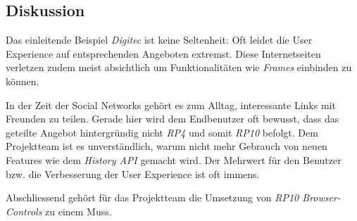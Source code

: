\subsection*{Diskussion}

Das einleitende Beispiel \emph{Digitec} ist keine Seltenheit: Oft leidet die User Experience auf entsprechenden Angeboten extremst. Diese Internetseiten verletzen zudem meist absichtlich  um Funktionalitäten wie \emph{\gls{Frames}} einbinden zu können.

In der Zeit der Social Networks gehört es zum Alltag, interessante Links mit Freunden zu teilen. Gerade hier wird dem Endbenutzer oft bewusst, dass das geteilte Angebot hintergründig nicht \emph{RP4} und somit \emph{RP10} befolgt. Dem Projektteam ist es unverständlich, warum nicht mehr Gebrauch von neuen Features wie dem \emph{History API} gemacht wird. Der Mehrwert für den Benutzer bzw. die Verbesserung der User Experience ist oft immens.

Abschliessend gehört für das Projektteam die Umsetzung von \emph{RP10 Browser-Controls} zu einem Muss.